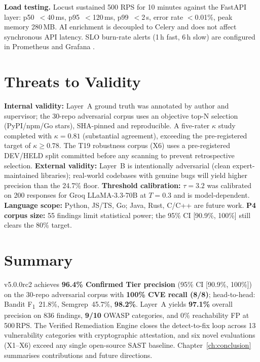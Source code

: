\textbf{Load testing.} Locust \cite{locust_tool} sustained 500 RPS for 10 minutes against the FastAPI layer: p50~$<$40\,ms, p95~$<$120\,ms, p99~$<$2\,s, error rate $<$0.01\%, peak memory 280\,MB. AI enrichment is decoupled to Celery and does not affect synchronous API latency. SLO burn-rate alerts (1\,h fast, 6\,h slow) are configured in Prometheus \cite{prometheus_docs} and Grafana \cite{grafana_docs}.

\section{Threats to Validity}
\label{sec:threats}

\textbf{Internal validity:} Layer~A ground truth was annotated by author and supervisor; the 30-repo adversarial corpus uses an objective top-N selection (PyPI/npm/Go stars), SHA-pinned and reproducible. A five-rater $\kappa$ study completed with $\kappa = 0.81$ (substantial agreement), exceeding the pre-registered target of $\kappa \geq 0.78$. The T19 robustness corpus (X6) uses a pre-registered DEV/HELD split committed before any scanning to prevent retrospective selection. \textbf{External validity:} Layer~B is intentionally adversarial (clean expert-maintained libraries); real-world codebases with genuine bugs will yield higher precision than the 24.7\% floor. \textbf{Threshold calibration:} $\tau = 3.2$ was calibrated on 200 responses for Groq LLaMA-3.3-70B at $T=0.3$ and is model-dependent. \textbf{Language scope:} Python, JS/TS, Go; Java, Rust, C/C++ are future work. \textbf{P4 corpus size:} 55 findings limit statistical power; the 95\% CI [90.9\%, 100\%] still clears the 80\% target.

\section{Summary}
\label{sec:ch5_summary}

\ACRQA{} v5.0.0rc2 achieves \textbf{96.4\% Confirmed Tier precision} (95\% CI [90.9\%, 100\%]) on the 30-repo adversarial corpus with \textbf{100\% CVE recall (8/8)}; head-to-head: Bandit F\textsubscript{1}~21.8\%, Semgrep~45.7\%, \ACRQA{} \textbf{98.2\%}. Layer~A yields \textbf{97.1\%} overall precision on 836 findings, \textbf{9/10} OWASP categories, and 0\% reachability FP at 500\,RPS. The Verified Remediation Engine closes the detect-to-fix loop across 13 vulnerability categories with cryptographic attestation, and six novel evaluations (X1--X6) exceed any single open-source SAST baseline. Chapter~\ref{ch:conclusion} summarises contributions and future directions.

\clearpage

